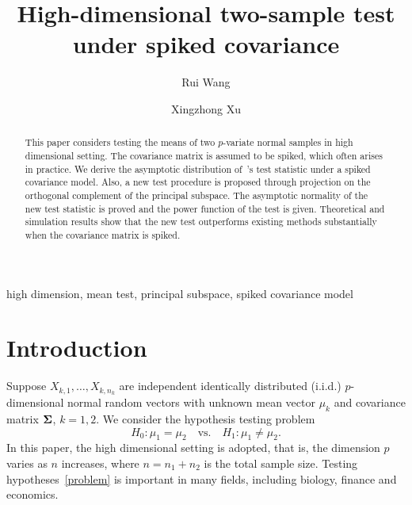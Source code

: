 \documentclass[review]{elsarticle}
\theoremstyle{plain}
\theoremstyle{definition}
\theoremstyle{remark}
\begin{document}
\begin{frontmatter}

\title{High-dimensional two-sample test under spiked covariance}

    \author[mymainaddress]{Rui Wang}
    \author[mymainaddress,mysecondaryaddress]{Xingzhong Xu}
    \address[mymainaddress]{School of Mathematics and Statistics, Beijing Institute of Technology, Beijing 
    100081,China}
    \address[mysecondaryaddress]{Beijing Key Laboratory on MCAACI, Beijing Institute of Technology, Beijing 100081,China}




\begin{abstract}
    This paper considers testing the means of two $p$-variate normal samples in high dimensional setting.
    The covariance matrix is assumed to be spiked, which often arises in practice. 
    We derive the asymptotic distribution of~\cite{Chen2010A}'s test statistic under a spiked covariance model.
    Also, a new test procedure is proposed through projection on the orthogonal complement of the principal subspace.
    The asymptotic normality of the new test statistic is proved and the power function of the test is given.
    Theoretical and simulation results show that the new test outperforms existing methods substantially when the covariance matrix is spiked.
\end{abstract}

\begin{keyword}
    high dimension, mean test, principal subspace, spiked covariance model
\end{keyword}

\end{frontmatter}




\section{Introduction}

Suppose $X_{k,1},\ldots,X_{k,n_k}$  are independent identically distributed (i.i.d.) $p$-dimensional normal random vectors with unknown mean vector $\mu_k$ and covariance matrix $\boldsymbol{\Sigma}$, $k=1,2$. We consider the hypothesis testing problem
\begin{equation}\label{problem}
    H_0:\mu_1=\mu_2\quad \textrm{vs.}\quad H_1:\mu_1\neq \mu_2.
\end{equation}
 In this paper, {the} high dimensional setting is adopted, that is, the dimension $p$ varies as $n$ increases, where $n=n_1+n_2$ is the total sample size.
Testing hypotheses~\eqref{problem} is important in many fields, including biology, finance and economics.
\end{document}
